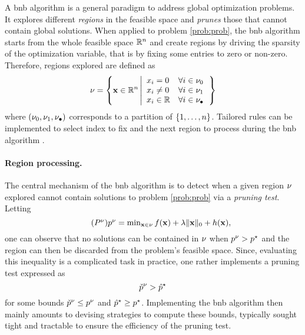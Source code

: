 \documentclass[11pt]{article}
\begin{document}
A \gls{bnb} algorithm is a general paradigm to address global optimization problems.
It explores different \emph{regions} in the feasible space and \emph{prunes} those that cannot contain global solutions.
When applied to problem \eqref{prob:prob}, the \gls{bnb} algorithm starts from the whole feasible space $\kR^{\pdim}$ and create regions by driving the sparsity of the optimization variable, that is by fixing some entries to zero or non-zero.
Therefore, regions explored are defined as
\begin{equation}
    \label{eq:region}
    \nodesymbol = \left\{
        \pv \in \kR^{\pdim}
        \left|
        \begin{array}{ll}
            \pvi{\idxentry} = 0 &\forall \idxentry \in \setzero \\
            \pvi{\idxentry} \neq 0 &\forall \idxentry \in \setone \\
            \pvi{\idxentry} \in \kR &\forall \idxentry \in \setnone
        \end{array}
        \right.
    \right\}
\end{equation}
where $(\nu_0,\nu_1,\nu_\bullet)$ corresponds to a partition of $\{1,\dots,n\}$.
Tailored rules can be implemented to select index to fix and the next region to process during the \gls{bnb} algorithm \citep{samain2023techniques}.

\paragraph{Region processing.}
The central mechanism of the \gls{bnb} algorithm is to detect when a given region $\nu$ explored cannot contain solutions to problem \eqref{prob:prob} via a \emph{pruning test}.
Letting 
\begin{equation}
    \label{prob:prob-node}
    \tag{$\node{\ppb}$}
    \textstyle
    \node{\pobj} = \min_{\pv \in \nodesymbol} \lfunc(\pv) + \reg\norm{\pv}{0} + \pfunc(\pv)
    ,
\end{equation}
one can observe that no solutions can be contained in $\nu$ when $p^\nu > p^{\star}$ and the region can then be discarded from the problem's feasible space.
Since, evaluating this inequality is a complicated task in practice, one rather implements a pruning test expressed as
\begin{equation}
    \label{eq:pruning-test}
    \check{p}^\nu > \hat{p}^{\star}
\end{equation}
for some bounds $\check{p}^\nu \leq p^\nu$ and $\hat{p}^{\star} \geq p^{\star}$.
Implementing the \gls{bnb} algorithm then mainly amounts to devising strategies to compute these bounds, typically sought tight and tractable to ensure the efficiency of the pruning test.
\end{document}
